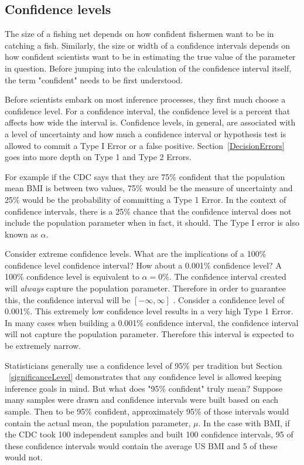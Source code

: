 \subsection{Confidence levels}
\label{confidenceLevels}

The size of a fishing net depends on how confident fishermen want to be in catching a fish. Similarly, the size or width of a confidence intervals depends on how confident scientists want to be in estimating the true value of the parameter in question. Before jumping into the calculation of the confidence interval itself, the term "confident" needs to be first understood. 

Before scientists embark on most inference processes, they first much choose a confidence level. For a confidence interval, the confidence level is a percent that affects how wide the interval is. Confidence levels, in general, are associated with a level of uncertainty and how much a confidence interval or hypothesis test is allowed to commit a Type I Error or a false positive. Section~\ref{DecisionErrors} goes into more depth on Type 1 and Type 2 Errors. 

For example if the CDC says that they are 75\% confident that the population mean BMI is between two values, 75\% would be the measure of uncertainty and 25\% would be the probability of committing a Type 1 Error. In the context of confidence intervals, there is a 25\% chance that the confidence interval does not include the population parameter when in fact, it should. The Type I error is also known as $\alpha$.  

\begin{example}{Consider extreme confidence levels. What are the implications of a 100\% confidence level confidence interval? How about a 0.001\% confidence level?} \label{extremeConfidenceLevels}
A 100\% confidence level is equivalent to $\alpha = 0\%$. The confidence interval created will \emph{always} capture the population parameter. Therefore in order to guarantee this, the confidence interval will be $[-\infty, \infty]$ . Consider a confidence level of 0.001\%. This extremely low confidence level results in a very high Type 1 Error. In many cases when building a 0.001\% confidence interval, the confidence interval will not capture the population parameter. Therefore this interval is expected to be extremely narrow. 
\end{example}

Statisticians generally use a confidence level of 95\% per tradition but Section ~\ref{significanceLevel} demonstrates that any confidence level is allowed keeping inference goals in mind. But what does "95\% confident" truly mean? Suppose many samples were drawn and confidence intervals were built based on each sample. Then to be 95\% confident, approximately 95\% of those intervals would contain the actual mean, the population parameter, $\mu$. In the case with BMI, if the CDC took 100 independent samples and built 100 confidence intervals, 95 of these confidence intervals would contain the average US BMI and 5 of these would not.

